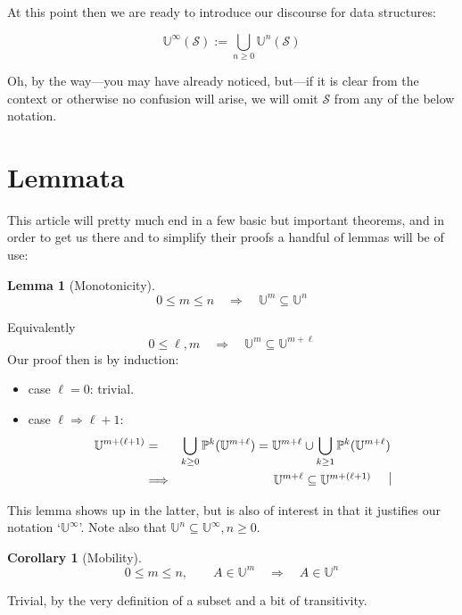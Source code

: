 \documentclass[twoside]{article}
\newcommand{\nthus}[2][U]{\ensuremath{\mathbb{#1}^{#2}}}
\newcommand{\psunion}[2][P]{\ensuremath{\bigcup_{#2\ge 0}\mathbb{#1}^{#2}}}
\newcommand{\opsunion}[3][P]{\ensuremath{\bigcup_{#2\ge #3}\mathbb{#1}^{#2}}}
\newcommand{\usunion}[2][U]{\ensuremath{\bigcup_{#2\ge 0}\mathbb{#1}^{#2}}}
\newcommand{\stratified}{\ensuremath{\mathbb{U}^\infty}}
\newcommand{\of}[1]{\ensuremath{(\mathcal{#1})}}
\newcommand{\then}{\ensuremath{\quad\Longrightarrow\quad}}
\newtheorem{lemma}[theorem]{Lemma}
\newtheorem{corollary}[theorem]{Corollary}
\newenvironment{proof}[1][Proof]{\begin{trivlist}
\item[\hskip \labelsep {\bfseries #1}]}{\end{trivlist}}
\newenvironment{definition}[1][Definition]{\begin{trivlist}
\item[\hskip \labelsep {\bfseries #1:}]}{\end{trivlist}}
\newcommand{\qed}{\nobreak \ifvmode \relax \else
      \ifdim\lastskip<1.5em \hskip-\lastskip
      \hskip1.5em plus0em minus0.5em \fi \nobreak
      \vrule height0.75em width0.5em depth0.25em\fi}
\begin{document}
At this point then we are ready to introduce our discourse for data structures:
\begin{definition}[Stratified Powerset]
$$ \stratified\of{S} := \usunion{n}\of{S} $$
\end{definition}

Oh, by the way---you may have already noticed, but---if it is clear from the context or otherwise no confusion will arise,
we will omit $ \mathcal{S} $ from any of the below notation.

\section*{Lemmata}

This article will pretty much end in a few basic but important theorems, and in order to get us there and to simplify
their proofs a handful of lemmas will be of use:

\begin{lemma}[Monotonicity]
$$ 0\le m\le n\then\nthus{m}\subseteq\nthus{n} $$
\end{lemma}

\begin{proof}

Equivalently
$$ 0\le\ell, m\then\nthus{m}\subseteq\nthus{m+\ell} $$
Our proof then is by induction:
\begin{itemize}
\item case $ \ell=0 $: trivial.
\item case $ \ell\Longrightarrow\ell+1 $:
\begin{eqnarray*}
\nthus{m+(\ell+1)} & = & \psunion{k}(\nthus{m+\ell})=\nthus{m+\ell}\cup\opsunion{k}{1}(\nthus{m+\ell}) \\
& \Longrightarrow & \nthus{m+\ell}\subseteq\nthus{m+(\ell+1)}\qed
\end{eqnarray*}
\end{itemize}
\end{proof}
This lemma shows up in the latter, but is also of interest in that it justifies our notation `$ \stratified $'.
Note also that $ \nthus{n}\subseteq\stratified, n\ge 0 $.

\begin{corollary}[Mobility]
$$ 0\le m\le n,\qquad A\in\nthus{m}\then A\in\nthus{n} $$
\end{corollary}

\begin{proof}
Trivial, by the very definition of a subset and a bit of transitivity.\qed
\end{proof}
\end{document}
